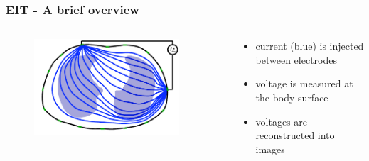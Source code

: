 \documentclass[10pt,    %
    english,            %
    xcolor=table,       %
    envcountsect,        %
    aspectratio=1610
]{beamer}
\begin{document}
\begin{frame}
	\frametitle{EIT - A brief overview}    
\begin{columns}[c]
	\begin{column}{0.5\textwidth}
		\begin{figure}[H]
			\centering
			\includegraphics[width=0.9\textwidth]{current_density_injection.pdf}
		\end{figure}
	\end{column}
	\begin{column}{0.5\textwidth}
		\begin{itemize}
			\item \alert{current (blue) is injected between electrodes}
			\item voltage is measured at the body surface
			\item voltages are reconstructed into images
		\end{itemize}
	\end{column}
\end{columns}
\end{frame}
\end{document}
